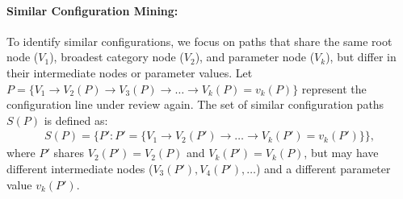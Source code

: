
\paragraph{Similar Configuration Mining:} To identify similar configurations, we focus on paths that share the same root node (\(V_1\)), broadest category node (\(V_2\)), and parameter node (\(V_k\)), but differ in their intermediate nodes or parameter values. Let \( P = \{ V_1 \rightarrow V_2(P) \rightarrow V_3(P) \rightarrow \dots \rightarrow V_k(P) = v_k(P) \} \) represent the configuration line under review again.
The set of similar configuration paths \( S(P) \) is defined as:
\begin{multline*}
S(P) = \{ P' : P' = \{ V_1 \rightarrow V_2(P') \rightarrow \dots \rightarrow V_k(P') = v_k(P') \} \},
\end{multline*}
where \( P' \) shares \(V_2(P') = V_2(P)\) and \(V_k(P') = V_k(P)\), but may have different intermediate nodes (\( V_3(P'), V_4(P'), \dots \)) and a different parameter value \( v_k(P') \).

